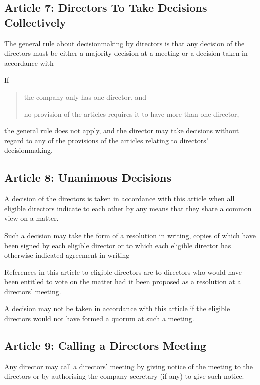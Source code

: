 \documentclass[letterpaper,10pt,openany,oneside,english]{sphinxmanual}
\begin{document}
\subsection{Article 7: Directors To Take Decisions Collectively}
\label{\detokenize{directors:article-7-directors-to-take-decisions-collectively}}\label{\detokenize{directors:article-7}}
 The general rule about decisionmaking by directors is that any decision of the directors must be either a majority decision at a meeting or a decision taken in accordance with {\hyperref[\detokenize{directors:article-8}]{}}

 If
\begin{quote}

 the company only has one director, and

 no provision of the articles requires it to have more than one director,
\end{quote}

the general rule does not apply, and the director may take decisions without regard to any of the provisions of the articles relating to directors’ decisionmaking.


\subsection{Article 8: Unanimous Decisions}
\label{\detokenize{directors:article-8-unanimous-decisions}}\label{\detokenize{directors:article-8}}
 A decision of the directors is taken in accordance with this article when all eligible directors indicate to each other by any means that they share a common view on a matter.

 Such a decision may take the form of a resolution in writing, copies of which have been signed by each eligible director or to which each eligible director has otherwise indicated agreement in writing

 References in this article to eligible directors are to directors who would have been entitled to vote on the matter had it been proposed as a resolution at a directors’ meeting.

 A decision may not be taken in accordance with this article if the eligible directors would not have formed a quorum at such a meeting.


\subsection{Article 9: Calling a Directors Meeting}
\label{\detokenize{directors:article-9-calling-a-directors-meeting}}\label{\detokenize{directors:article-9}}
 Any director may call a directors’ meeting by giving notice of the meeting to the directors or by authorising the company secretary (if any) to give such notice.
\end{document}
